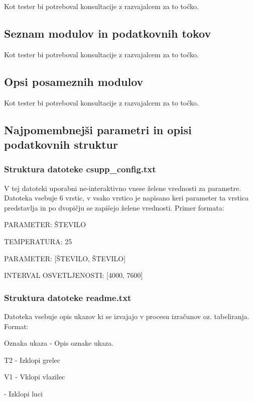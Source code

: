 \documentclass[a4paper,12pt]{article}
\begin{document}
		\qquad Kot tester bi potreboval konsultacije z razvajalcem za to točko.

		\subsection{Seznam modulov in podatkovnih tokov}
		
		\qquad Kot tester bi potreboval konsultacije z razvajalcem za to točko.
		
		\subsection{Opsi posameznih modulov}
		
		\qquad Kot tester bi potreboval konsultacije z razvajalcem za to točko.

		\subsection{Najpomembnejši parametri in opisi podatkovnih struktur}
			
			\subsubsection{Struktura datoteke csupp\_config.txt}

			\quad V tej datoteki uporabni ne-interaktivno vnese želene vrednosti za parametre.
			Datoteka vsebuje 6 vrstic, v vsako vrstico je napisano keri parameter ta vrstica predstavlja 
			in po dvopičju se zapišejo želene vrednosti. Primer formata:

			\quad PARAMETER: ŠTEVILO

			\quad TEMPERATURA: 25
			
			\quad PARAMETER: [ŠTEVILO, ŠTEVILO]
			
			\quad INTERVAL OSVETLJENOSTI: [4000, 7600]

			\subsubsection{Struktura datoteke readme.txt}

			\quad Datoteka vsebuje opis ukazov ki se izvajajo v procesu izračunov oz. tabeliranja. Format:

			\quad Oznaka ukaza - Opis oznake ukaza.

			\quad T2 - Izklopi grelec

			\quad V1 - Vklopi vlazilec

			 - Izklopi luci
\end{document}
